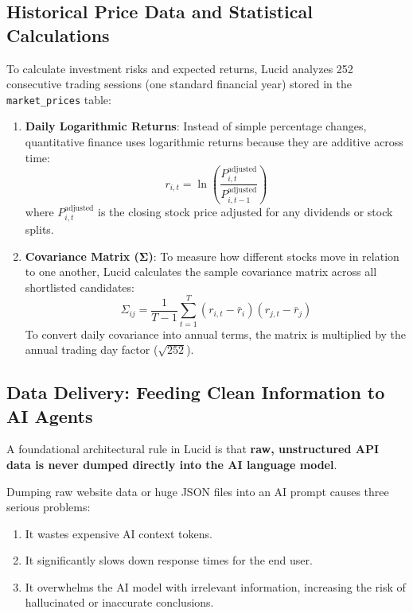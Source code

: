 \subsection{Historical Price Data and Statistical Calculations}
To calculate investment risks and expected returns, Lucid analyzes 252 consecutive trading sessions (one standard financial year) stored in the \texttt{market\_prices} table:

\begin{enumerate}
    \item \textbf{Daily Logarithmic Returns}:
    Instead of simple percentage changes, quantitative finance uses logarithmic returns because they are additive across time:
    \begin{equation}
    r_{i,t} = \ln \left( \frac{P_{i,t}^{\text{adjusted}}}{P_{i,t-1}^{\text{adjusted}}} \right)
    \end{equation}
    where $P_{i,t}^{\text{adjusted}}$ is the closing stock price adjusted for any dividends or stock splits.
    \item \textbf{Covariance Matrix ($\mathbf{\Sigma}$)}:
    To measure how different stocks move in relation to one another, Lucid calculates the sample covariance matrix across all shortlisted candidates:
    \begin{equation}
    \Sigma_{ij} = \frac{1}{T-1} \sum_{t=1}^{T} (r_{i,t} - \bar{r}_i)(r_{j,t} - \bar{r}_j)
    \end{equation}
    To convert daily covariance into annual terms, the matrix is multiplied by the annual trading day factor ($\sqrt{252}$).
\end{enumerate}

\subsection{Data Delivery: Feeding Clean Information to AI Agents}
A foundational architectural rule in Lucid is that \textbf{raw, unstructured API data is never dumped directly into the AI language model}.

Dumping raw website data or huge JSON files into an AI prompt causes three serious problems:
\begin{enumerate}
    \item It wastes expensive AI context tokens.
    \item It significantly slows down response times for the end user.
    \item It overwhelms the AI model with irrelevant information, increasing the risk of hallucinated or inaccurate conclusions.
\end{enumerate}

